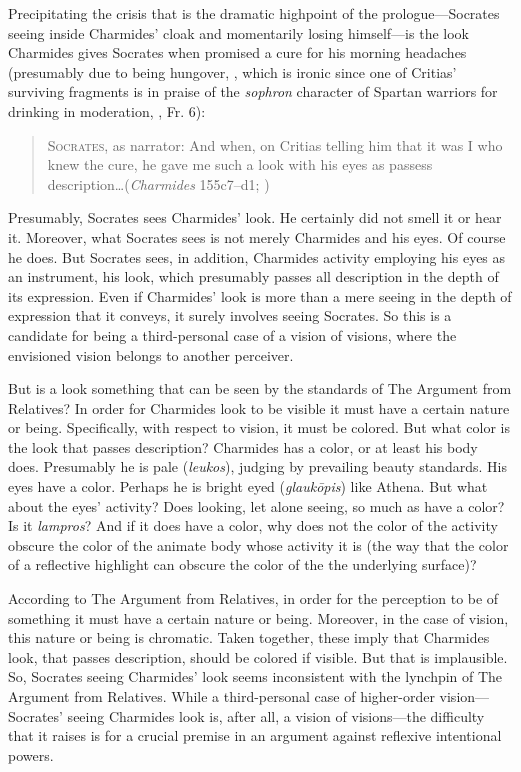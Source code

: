 Precipitating the crisis that is the dramatic highpoint of the prologue—Socrates seeing inside Charmides' cloak and momentarily losing himself—is the look Char\-mi\-des gives Socrates when promised a cure for his morning headaches (presumably due to being hungover, \citealt[41–2]{Hyland:1981aa}, which is ironic since one of Critias' surviving fragments is in praise of the \emph{sophron} character of Spartan warriors for drinking in moderation, \citealt{Diels:1974aa}, Fr. 6): 
\begin{quote}
	\textsc{Socrates}, as narrator: And when, on Critias telling him that it was I who knew the cure, he gave me such a look with his eyes as passess description\ldots (\emph{Charmides} 155c7–d1; \citealt{Lamb:1927qw})
\end{quote}
Presumably, Socrates sees Charmides' look. He certainly did not smell it or hear it. Moreover, what Socrates sees is not merely Charmides and his eyes. Of course he does. But Socrates sees, in addition, Charmides activity employing his eyes as an instrument, his look, which presumably passes all description in the depth of its expression. Even if Charmides' look is more than a mere seeing in the depth of expression that it conveys, it surely involves seeing Socrates. So this is a candidate for being a third-personal case of a vision of visions, where the envisioned vision belongs to another perceiver.

But is a look something that can be seen by the standards of The Argument from Relatives? In order for Charmides look to be visible it must have a certain nature or being. Specifically, with respect to vision, it must be colored. But what color is the look that passes description? Charmides has a color, or at least his body does. Presumably he is pale (\emph{leukos}), judging by prevailing beauty standards. His eyes have a color. Perhaps he is bright eyed (\emph{glaukōpis}) like Athena. But what about the eyes' activity? Does looking, let alone seeing, so much as have a color? Is it \emph{lampros}? And if it does have a color, why does not the color of the activity obscure the color of the animate body whose activity it is (the way that the color of a reflective highlight can obscure the color of the the underlying surface)?

According to The Argument from Relatives, in order for the perception to be of something it must have a certain nature or being. Moreover, in the case of vision, this nature or being is chromatic. Taken together, these imply that Charmides look, that passes description, should be colored if visible. But that is implausible. So, Socrates seeing Charmides' look seems inconsistent with the lynchpin of The Argument from Relatives. While a third-personal case of higher-order vision—Socrates' seeing Charmides look is, after all, a vision of visions—the difficulty that it raises is for a crucial premise in an argument against reflexive intentional powers.

